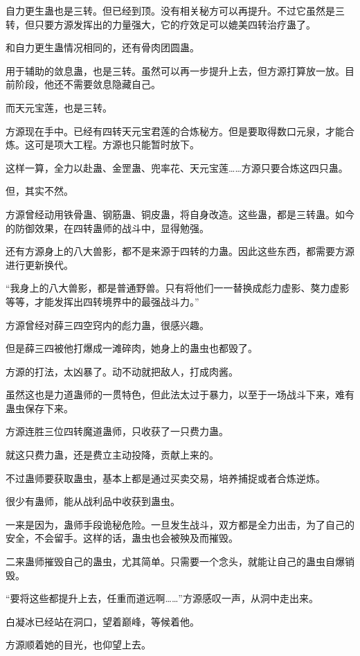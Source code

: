 \begin{this_body}
自力更生蛊也是三转。但已经到顶。没有相关秘方可以再提升。不过它虽然是三转，但只要方源发挥出的力量强大，它的疗效足可以媲美四转治疗蛊了。

和自力更生蛊情况相同的，还有骨肉团圆蛊。

用于辅助的敛息蛊，也是三转。虽然可以再一步提升上去，但方源打算放一放。目前阶段，他还不需要敛息隐藏自己。

而天元宝莲，也是三转。

方源现在手中。已经有四转天元宝君莲的合炼秘方。但是要取得数口元泉，才能合炼。这可是项大工程。方源也只能暂时放下。

这样一算，全力以赴蛊、金罡蛊、兜率花、天元宝莲……方源只要合炼这四只蛊。

但，其实不然。

方源曾经动用铁骨蛊、钢筋蛊、铜皮蛊，将自身改造。这些蛊，都是三转蛊。如今的防御效果，在四转蛊师的战斗中，显得勉强。

还有方源身上的八大兽影，都不是来源于四转的力蛊。因此这些东西，都需要方源进行更新换代。

“我身上的八大兽影，都是普通野兽。只有将他们一一替换成彪力虚影、獒力虚影等等，才能发挥出四转境界中的最强战斗力。”

方源曾经对薛三四空窍内的彪力蛊，很感兴趣。

但是薛三四被他打爆成一滩碎肉，她身上的蛊虫也都毁了。

方源的打法，太凶暴了。动不动就把敌人，打成肉酱。

虽然这也是力道蛊师的一贯特色，但此法太过于暴力，以至于一场战斗下来，难有蛊虫保存下来。

方源连胜三位四转魔道蛊师，只收获了一只费力蛊。

就这只费力蛊，还是费立主动投降，贡献上来的。

不过蛊师要获取蛊虫，基本上都是通过买卖交易，培养捕捉或者合炼逆炼。

很少有蛊师，能从战利品中收获到蛊虫。

一来是因为，蛊师手段诡秘危险。一旦发生战斗，双方都是全力出击，为了自己的安全，不会留手。这样的话，蛊虫也会被殃及而摧毁。

二来蛊师摧毁自己的蛊虫，尤其简单。只需要一个念头，就能让自己的蛊虫自爆销毁。

“要将这些都提升上去，任重而道远啊……”方源感叹一声，从洞中走出来。

白凝冰已经站在洞口，望着巅峰，等候着他。

方源顺着她的目光，也仰望上去。


\end{this_body}
